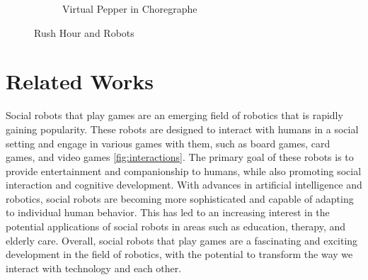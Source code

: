 \documentclass{article}
\begin{document}
\begin{figure}[H]
\begin{subfigure}{.33\textwidth}
      \caption{Virtual Pepper in Choregraphe}
      \label{fig:choregraphe}
    \end{subfigure}
    \caption{Rush Hour and Robots}
\end{figure}

\section{Related Works}
\indent Social robots that play games are an emerging field of robotics that is rapidly gaining popularity. These robots are designed to interact with humans in a social setting and engage in various games with them, such as board games, card games, and video games \ref{fig:interactions}. The primary goal of these robots is to provide entertainment and companionship to humans, while also promoting social interaction and cognitive development. With advances in artificial intelligence and robotics, social robots are becoming more sophisticated and capable of adapting to individual human behavior. This has led to an increasing interest in the potential applications of social robots in areas such as education, therapy, and elderly care. Overall, social robots that play games are a fascinating and exciting development in the field of robotics, with the potential to transform the way we interact with technology and each other.
\end{document}
